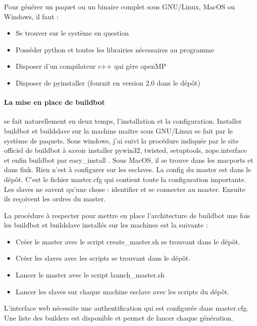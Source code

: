 \documentclass[12pt,a4paper]{article}
\begin{document}
    Pour générer un paquet ou un binaire complet sous GNU/Linux, MacOS ou Windows, il faut : 
    \begin{itemize}
    \item Se trouver sur le système en question
    \item Posséder python et toutes les librairies nécessaires au programme
    \item Disposer d'un compilateur c++ qui gère openMP
    \item Disposer de pyinstaller (fournit en version 2.0 dans le dépôt)\\
    \end{itemize}

    \paragraph{La mise en place de buildbot} se fait naturellement en deux temps,
    l'installation et la configuration. Installer buildbot et buildslave sur la machine maitre
    sous GNU/Linux se fait par le système de paquets. Sous windows, j'ai suivi la procédure
    indiquée par le site officiel de buildbot à savoir installer pywin32, twisted, setuptools, zope.interface
    et enfin buildbot par easy\_install . Sous MacOS, il se trouve dans les macports et dans fink. Rien n'est
    à configurer sur les esclaves. La config du master est dans le dépôt. C'est
    le fichier master.cfg qui contient toute la configuration importante. Les
    slaves ne savent qu'une chose : identifier et se connecter au master.
    Ensuite ils reçoivent les ordres du master.

    La procédure à respecter pour mettre en place l'architecture de buildbot une
    fois les buildbot et buildslave installés sur les machines est la suivante :

    \begin{itemize}
    \item Créer le master avec le script create\_master.sh se trouvant dans le
        dépôt.
    \item Créer les slaves avec les scripts se trouvant dans le dépôt.
    \item Lancer le master avec le script launch\_master.sh
    \item Lancer les slaves sur chaque machine esclave avec les scripts du
        dépôt.\\
    \end{itemize}

    L'interface web nécessite une authentification qui est configurée dans
    master.cfg. Une liste des builders est disponible et permet de lancer chaque
    génération.
\end{document}
